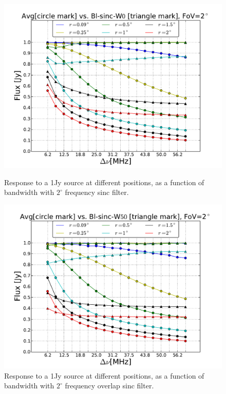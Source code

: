 \documentclass[useAMS,usenatbib]{mn2e}
\begin{document}
\begin{figure}
  \centering
\begin{minipage}{0.36\linewidth}\includegraphics[width=1\textwidth]{./Figures/max-integ-freq-sinc-w1x1-fov2.pdf}
  \caption{Response to a 1Jy source at different positions, as a function of  bandwidth with $2^{\circ}$ frequency sinc filter.}
  \label{fig:max-integ-freq-sinc-w1x1-fov2}
\end{minipage}
\hspace{1cm}
\begin{minipage}{0.36\linewidth}\includegraphics[width=1\textwidth]{./Figures/max-integ-freq-sinc-w1x50-fov2.pdf}
      \caption{Response to a 1Jy source at different positions, as a function of bandwidth with $2^{\circ}$ frequency overlap sinc filter.}

\end{minipage}
\end{figure}
\end{document}
